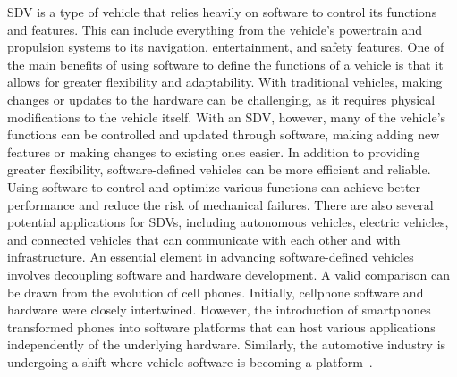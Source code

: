     SDV is a type of vehicle that relies heavily on software to control its functions and features. This can include everything from the vehicle's powertrain and propulsion systems to its navigation, entertainment, and safety features.
    One of the main benefits of using software to define the functions of a vehicle is that it allows for greater flexibility and adaptability. With traditional vehicles, making changes or updates to the hardware can be challenging, as it requires physical modifications to the vehicle itself. With an SDV, however, many of the vehicle's functions can be controlled and updated through software, making adding new features or making changes to existing ones easier.
    In addition to providing greater flexibility, software-defined vehicles can be more efficient and reliable. Using software to control and optimize various functions can achieve better performance and reduce the risk of mechanical failures.
    There are also several potential applications for SDVs, including autonomous vehicles, electric vehicles, and connected vehicles that can communicate with each other and with infrastructure. 
    An essential element in advancing software-defined vehicles involves decoupling software and hardware development. A valid comparison can be drawn from the evolution of cell phones. Initially, cellphone software and hardware were closely intertwined. However, the introduction of smartphones transformed phones into software platforms that can host various applications independently of the underlying hardware. Similarly, the automotive industry is undergoing a shift where vehicle software is becoming a platform~\cite{SDV1, SDV2}. 
    
